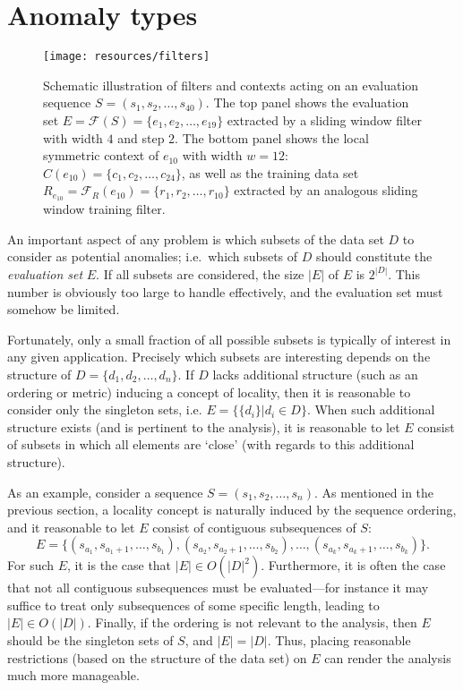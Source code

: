 \section{Anomaly types}
\label{sect:anomaly_types}

\begin{figure}[htb]
    \begin{center}
        \texttt{[image: resources/filters]}
    \end{center}
    \caption{{\small Schematic illustration of filters and contexts acting on an evaluation sequence $S = (s_1, s_2, \dots, s_{40})$. The top panel shows the evaluation set $E = \mathcal{F}(S) = \{e_1, e_2, \dots, e_{19}\}$ extracted by a sliding window filter with width $4$ and step $2$. The bottom panel shows the local symmetric context of $e_{10}$ with width $w = 12$: $C(e_{10}) = \{c_1, c_2, \dots, c_{24}\}$, as well as the training data set $R_{e_{10}} = \mathcal{F}_R(e_{10}) = \{r_1, r_2, \dots, r_{10}\}$ extracted by an analogous sliding window training filter.}}
\label{fig:filters}
\end{figure}

An important aspect of any problem is which subsets of the data set $D$ to consider as potential anomalies; i.e.\ which subsets of $D$ should constitute the \emph{evaluation set} $E$. If all subsets are considered, the size $|E|$ of $E$ is $2^{|D|}$. This number is obviously too large to handle effectively, and the evaluation set must somehow be limited.

Fortunately, only a small fraction of all possible subsets is typically of interest in any given application. Precisely which subsets are interesting depends on the structure of $D = \{d_1, d_2, \dots, d_n\}$. If $D$ lacks additional structure (such as an ordering or metric) inducing a concept of locality, then it is reasonable to consider only the singleton sets, i.e. $E = \{\{d_i\} | d_i \in D\}$. When such additional structure exists (and is pertinent to the analysis), it is reasonable to let $E$ consist of subsets in which all elements are `close' (with regards to this additional structure).

As an example, consider a sequence $S = (s_1, s_2, \dots, s_n)$. As mentioned in the previous section, a locality concept is naturally induced by the sequence ordering, and it reasonable to let $E$ consist of contiguous subsequences of $S$:
\[
    E = \{(s_{a_1}, s_{a_1 + 1}, \dots , s_{b_1}) , (s_{a_2}, s_{a_2 +1}, \dots, s_{b_2}), \dots, (s_{a_k}, s_{a_k+1}, \dots, s_{b_k})\}.
\]
For such $E$, it is the case that $|E| \in O(|D|^2)$. Furthermore, it is often the case that not all contiguous subsequences must be evaluated---for instance it may suffice to treat only subsequences of some specific length, leading to $|E| \in O(|D|)$. Finally, if the ordering is not relevant to the analysis, then $E$ should be the singleton sets of $S$, and $|E| = |D|$. Thus, placing reasonable restrictions (based on the structure of the data set) on $E$ can render the analysis much more manageable.

